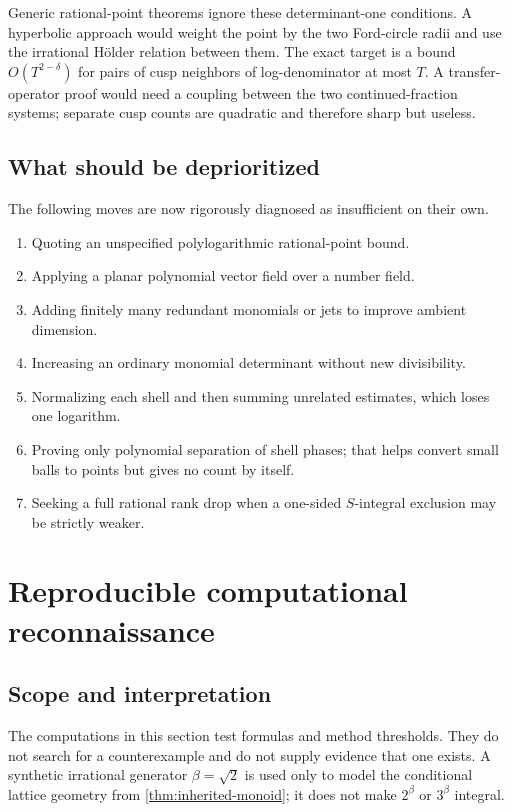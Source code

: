 \documentclass[10pt,oneside]{article}
\theoremstyle{definition}
\theoremstyle{remark}
\begin{document}
Generic rational-point theorems ignore these determinant-one conditions.  A hyperbolic approach would weight the point by the two Ford-circle radii and use the irrational Hölder relation between them.  The exact target is a bound \(O(T^{2-\delta})\) for pairs of cusp neighbors of log-denominator at most \(T\).  A transfer-operator proof would need a coupling between the two continued-fraction systems; separate cusp counts are quadratic and therefore sharp but useless.

\subsection{What should be deprioritized}
The following moves are now rigorously diagnosed as insufficient on their own.
\begin{enumerate}
\item Quoting an unspecified polylogarithmic rational-point bound.
\item Applying a planar polynomial vector field over a number field.
\item Adding finitely many redundant monomials or jets to improve ambient dimension.
\item Increasing an ordinary monomial determinant without new divisibility.
\item Normalizing each shell and then summing unrelated estimates, which loses one logarithm.
\item Proving only polynomial separation of shell phases; that helps convert small balls to points but gives no count by itself.
\item Seeking a full rational rank drop when a one-sided \(S\)-integral exclusion may be strictly weaker.
\end{enumerate}


\section{Reproducible computational reconnaissance}
\label{sec:computation}

\subsection{Scope and interpretation}
The computations in this section test formulas and method thresholds.  They do not search for a counterexample and do not supply evidence that one exists.  A synthetic irrational generator \(\beta=\sqrt2\) is used only to model the conditional lattice geometry from \cref{thm:inherited-monoid}; it does not make \(2^\beta\) or \(3^\beta\) integral.
\end{document}
